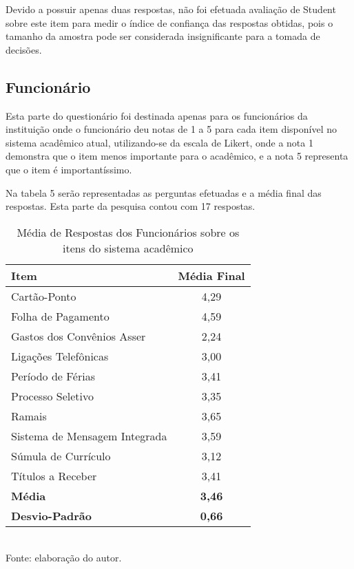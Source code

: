 Devido a possuir apenas duas respostas, não foi efetuada avaliação de Student sobre este item para medir o índice de confiança das respostas obtidas, pois o tamanho da amostra pode ser considerada insignificante para a tomada de decisões.


\subsection{Funcionário}
Esta parte do questionário foi destinada apenas para os funcionários da instituição onde o funcionário deu notas de 1 a 5 para cada item disponível no sistema acadêmico atual, utilizando-se da escala de Likert, onde  a nota 1 demonstra que o item menos importante para o acadêmico, e a nota 5 representa que o item é importantíssimo.

Na tabela 5 serão representadas as perguntas efetuadas e a média final das respostas. Esta parte da pesquisa contou com 17 respostas.

\begin{table}[!hbt]
\centering
\caption[Média de Respostas dos Funcionários]{Média de Respostas dos Funcionários sobre os itens do sistema acadêmico}
\vspace{3mm}
\begin{tabular}{p{9.5cm}|c}\hline
\textbf{Item} & \textbf{Média Final} \\ \hline
Cartão-Ponto & 4,29 \\ \hline
Folha de Pagamento & 4,59 \\ \hline
Gastos dos Convênios Asser & 2,24 \\ \hline
Ligações Telefônicas & 3,00 \\ \hline
Período de Férias & 3,41 \\ \hline
Processo Seletivo & 3,35 \\ \hline
Ramais & 3,65 \\ \hline
Sistema de Mensagem Integrada & 3,59 \\ \hline
Súmula de Currículo & 3,12 \\ \hline
Títulos a Receber & 3,41 \\ \hline
\textbf{Média} & \textbf{3,46} \\ \hline
\textbf{Desvio-Padrão} & \textbf{0,66} \\ \hline
\end{tabular}
\\ Fonte: elaboração do autor.
\end{table}

